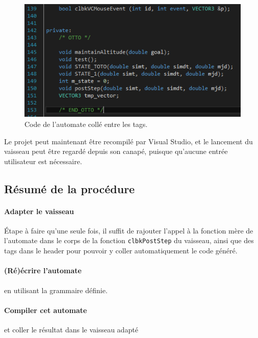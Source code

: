 \documentclass[a4paper,11pt]{article}
\begin{document}
        \begin{figure}[!h]
            \begin{center}
                \includegraphics{img/code_header.png}
                \caption{Code de l'automate collé entre les tags.}
            \end{center}
        \end{figure}
        
            Le projet peut maintenant être recompilé par Visual Studio, et le lancement du vaisseau peut être regardé depuis son canapé, puisque qu'aucune entrée utilisateur est nécessaire.
            
    \subsection{Résumé de la procédure}
        \paragraph{Adapter le vaisseau}
            \'Etape à faire qu'une seule fois, il suffit de rajouter l'appel à la fonction mère de l'automate dans le corps de la fonction \verb|clbkPostStep| du vaisseau, ainsi que des tags dans le header pour pouvoir y coller automatiquement le code généré.
            
        \paragraph{(Ré)écrire l'automate} en utilisant la grammaire définie.
        
        \paragraph{Compiler cet automate} et coller le résultat dans le vaisseau adapté
        
\end{document}
